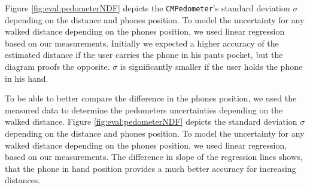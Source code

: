 Figure \ref{fig:eval:pedometerNDF} depicts the \texttt{CMPedometer}'s standard deviation $\sigma$ depending on the distance and phones position.
To model the uncertainty for any walked distance depending on the phones position, we used linear regression based on our measurements.
Initially we expected a higher accuracy of the estimated distance if the user carries the phone in his pants pocket, but the diagram proofs the opposite.
$\sigma$ is significantly smaller if the user holds the phone in his hand.

To be able to better compare the difference in the phones position, we used the measured data to determine the pedometers uncertainties depending on the walked distance.
Figure \ref{fig:eval:pedometerNDF} depicts the standard deviation $\sigma$ depending on the distance and phones position.
To model the uncertainty for any walked distance depending on the phones position, we used linear regression, based on our measurements.
The difference in slope of the regression lines shows, that the phone in hand position provides a much better accuracy for increasing distances.

